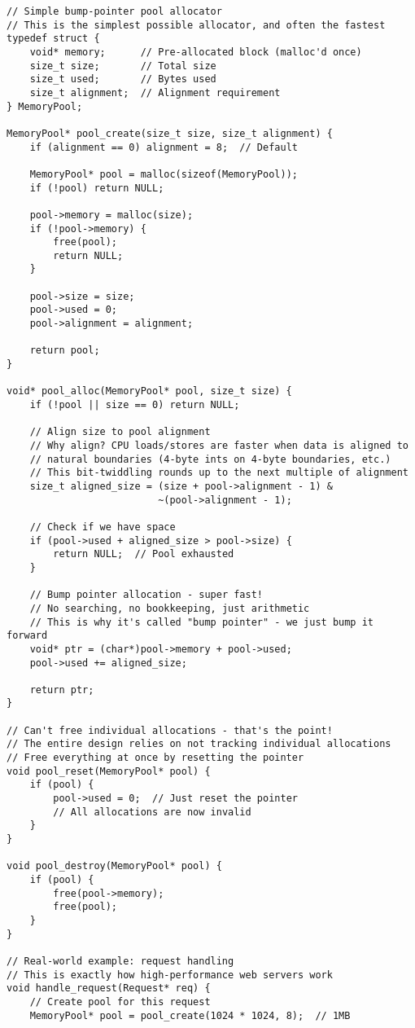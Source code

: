 \begin{lstlisting}
// Simple bump-pointer pool allocator
// This is the simplest possible allocator, and often the fastest
typedef struct {
    void* memory;      // Pre-allocated block (malloc'd once)
    size_t size;       // Total size
    size_t used;       // Bytes used
    size_t alignment;  // Alignment requirement
} MemoryPool;

MemoryPool* pool_create(size_t size, size_t alignment) {
    if (alignment == 0) alignment = 8;  // Default

    MemoryPool* pool = malloc(sizeof(MemoryPool));
    if (!pool) return NULL;

    pool->memory = malloc(size);
    if (!pool->memory) {
        free(pool);
        return NULL;
    }

    pool->size = size;
    pool->used = 0;
    pool->alignment = alignment;

    return pool;
}

void* pool_alloc(MemoryPool* pool, size_t size) {
    if (!pool || size == 0) return NULL;

    // Align size to pool alignment
    // Why align? CPU loads/stores are faster when data is aligned to
    // natural boundaries (4-byte ints on 4-byte boundaries, etc.)
    // This bit-twiddling rounds up to the next multiple of alignment
    size_t aligned_size = (size + pool->alignment - 1) &
                          ~(pool->alignment - 1);

    // Check if we have space
    if (pool->used + aligned_size > pool->size) {
        return NULL;  // Pool exhausted
    }

    // Bump pointer allocation - super fast!
    // No searching, no bookkeeping, just arithmetic
    // This is why it's called "bump pointer" - we just bump it forward
    void* ptr = (char*)pool->memory + pool->used;
    pool->used += aligned_size;

    return ptr;
}

// Can't free individual allocations - that's the point!
// The entire design relies on not tracking individual allocations
// Free everything at once by resetting the pointer
void pool_reset(MemoryPool* pool) {
    if (pool) {
        pool->used = 0;  // Just reset the pointer
        // All allocations are now invalid
    }
}

void pool_destroy(MemoryPool* pool) {
    if (pool) {
        free(pool->memory);
        free(pool);
    }
}

// Real-world example: request handling
// This is exactly how high-performance web servers work
void handle_request(Request* req) {
    // Create pool for this request
    MemoryPool* pool = pool_create(1024 * 1024, 8);  // 1MB


\end{lstlisting}
